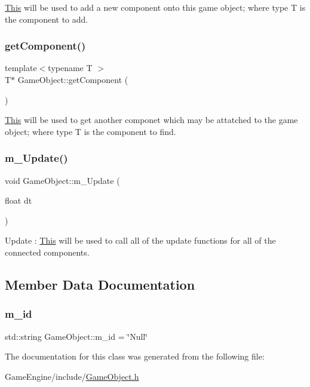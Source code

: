 \mbox{\hyperlink{class_this}{This}} will be used to add a new component onto this game object; where type T is the component to add. \mbox{\label{class_game_object_a1c50376c7f24439359a3962f57dfd513}} 
\subsubsection{\texorpdfstring{get\+Component()}{getComponent()}}
{\footnotesize\ttfamily template$<$typename T $>$ \\
T$\ast$ Game\+Object\+::get\+Component (\begin{DoxyParamCaption}{ }\end{DoxyParamCaption})\hspace{0.3cm}{\ttfamily [inline]}}

\mbox{\hyperlink{class_this}{This}} will be used to get another componet which may be attatched to the game object; where type T is the component to find. \mbox{\label{class_game_object_a3fcc5b3f446a2f8fe7c2943db2714750}} 
\subsubsection{\texorpdfstring{m\+\_\+\+Update()}{m\_Update()}}
{\footnotesize\ttfamily void Game\+Object\+::m\+\_\+\+Update (\begin{DoxyParamCaption}\item[{float}]{dt }\end{DoxyParamCaption})\hspace{0.3cm}{\ttfamily [inline]}}

Update \+: \mbox{\hyperlink{class_this}{This}} will be used to call all of the update functions for all of the connected components. 

\subsection{Member Data Documentation}
\mbox{\label{class_game_object_a31bee32d6133a448517e33704be97047}} 
\subsubsection{\texorpdfstring{m\+\_\+id}{m\_id}}
{\footnotesize\ttfamily std\+::string Game\+Object\+::m\+\_\+id = \char`\"{}Null\char`\"{}}



The documentation for this class was generated from the following file\+:\begin{DoxyCompactItemize}
\item 
Game\+Engine/include/\mbox{\hyperlink{_game_object_8h}{Game\+Object.\+h}}\end{DoxyCompactItemize}
